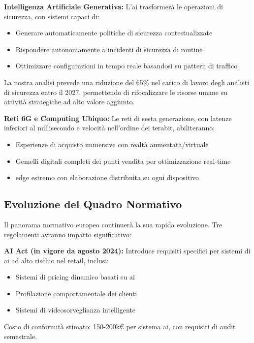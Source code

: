 \textbf{Intelligenza Artificiale Generativa:} L'\gls{ai} trasformerà le operazioni di sicurezza, con sistemi capaci di:
\begin{itemize}
\item Generare automaticamente politiche di sicurezza contestualizzate
\item Rispondere autonomamente a incidenti di sicurezza di routine
\item Ottimizzare configurazioni in tempo reale basandosi su pattern di traffico
\end{itemize}

La nostra analisi prevede una riduzione del 65\% nel carico di lavoro degli analisti di sicurezza entro il 2027, permettendo di rifocalizzare le risorse umane su attività strategiche ad alto valore aggiunto.

\textbf{Reti 6G e Computing Ubiquo:} Le reti di sesta generazione, con latenze inferiori al millisecondo e velocità nell'ordine dei terabit, abiliteranno:
\begin{itemize}
\item Esperienze di acquisto immersive con realtà aumentata/virtuale
\item Gemelli digitali completi dei punti vendita per ottimizzazione real-time
\item \gls{edge} estremo con elaborazione distribuita su ogni dispositivo
\end{itemize}

\subsection{\texorpdfstring{Evoluzione del Quadro Normativo}{5.5.2 - Evoluzione del Quadro Normativo}}
\label{subsec:5.5.2}

Il panorama normativo europeo continuerà la sua rapida evoluzione. Tre regolamenti avranno impatto significativo:

\textbf{AI Act (in vigore da agosto 2024):} Introduce requisiti specifici per sistemi di \gls{ai} ad alto rischio nel retail, inclusi:
\begin{itemize}
\item Sistemi di pricing dinamico basati su \gls{ai}
\item Profilazione comportamentale dei clienti
\item Sistemi di videosorveglianza intelligente
\end{itemize}

Costo di conformità stimato: 150-200k€ per sistema \gls{ai}, con requisiti di audit semestrale.

